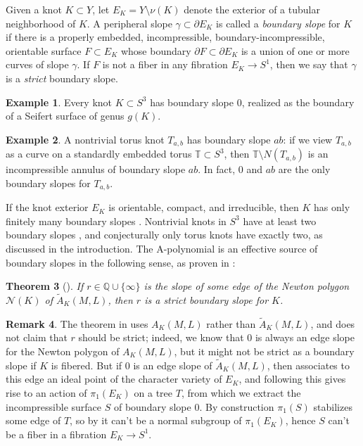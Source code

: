 \documentclass[11pt]{amsart}
\newtheorem {theorem}{Theorem}
\numberwithin{equation}{section}
\numberwithin{theorem}{section}
\theoremstyle{definition}
\newtheorem{remark}[theorem]{Remark}
\newtheorem{example}[theorem]{Example}
\newcommand{\Q}{\mathbb{Q}}
\newcommand{\cN}{\mathcal{N}}
\begin{document}
Given a knot $K\subset Y$, let $E_K = Y\setminus \nu(K)$ denote the exterior of a tubular neighborhood of $K$. A peripheral slope $\gamma \subset \partial E_K$ is called a \emph{boundary slope} for $K$ if there is a properly embedded, incompressible, boundary-incompressible, orientable surface $F \subset E_K$ whose boundary $\partial F \subset \partial E_K$ is a union of one or more curves of slope $\gamma$.  If $F$ is not a fiber in any fibration $E_K \to S^1$, then we say that $\gamma$ is a \emph{strict} boundary slope.

\begin{example} \label{ex:seifert-surface}
Every knot $K \subset S^3$ has boundary slope $0$, realized as the boundary of a Seifert surface of genus $g(K)$.
\end{example}

\begin{example}
A nontrivial torus knot $T_{a,b}$ has boundary slope $ab$: if we view $T_{a,b}$ as a curve on a standardly embedded torus $\mathbb{T} \subset S^3$, then $\mathbb{T} \setminus N(T_{a,b})$ is an incompressible annulus of boundary slope $ab$.  In fact, $0$ and $ab$ are the only boundary slopes for $T_{a,b}$.
\end{example}

If the knot exterior $E_K$ is orientable, compact, and irreducible, then $K$ has only finitely many boundary slopes \cite{hatcher-slopes}.  Nontrivial knots in $S^3$ have at least two boundary slopes \cite{cs-surfaces}, and conjecturally only torus knots have exactly two, as discussed in the introduction.  The A-polynomial is an effective source of boundary slopes in the following sense, as proven in {\cite[Theorem~3.4]{ccgls}}:

\begin{theorem}[] \label{thm:edge-slope}
If $r\in\Q\cup\{\infty\}$ is the slope of some edge of the Newton polygon $\cN(K)$ of $\tilde{A}_K(M,L)$, then $r$ is a strict boundary slope for $K$.
\end{theorem}

\begin{remark}
The theorem in \cite{ccgls} uses $A_K(M,L)$ rather than $\tilde{A}_K(M,L)$, and does not claim that $r$ should be strict; indeed, we know that $0$ is always an edge slope for the Newton polygon of $A_K(M,L)$, but it might not be strict as a boundary slope if $K$ is fibered.  But if $0$ is an edge slope of $\tilde{A}_K(M,L)$, then \cite[\S3]{ccgls} associates to this edge an ideal point of the character variety of $E_K$, and following \cite{cs-splittings} this gives rise to an action of $\pi_1(E_K)$ on a tree $T$, from which we extract the incompressible surface $S$ of boundary slope $0$.  By construction $\pi_1(S)$ stabilizes some edge of $T$, so by \cite[Proposition~1.2.7]{cgls} it can't be a normal subgroup of $\pi_1(E_K)$, hence $S$ can't be a fiber in a fibration $E_K \to S^1$.
\end{remark}
\end{document}
